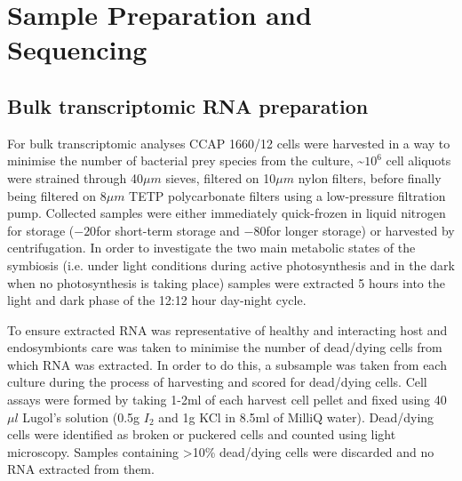 %
%


\section{Sample Preparation and Sequencing}

\subsection{Bulk transcriptomic RNA preparation}
For bulk transcriptomic analyses CCAP 1660/12 cells were harvested in a way to minimise the 
number of bacterial prey species from the culture, \textasciitilde \(10^{6}\) 
cell aliquots were strained through 40\(\mu m\) sieves, filtered on 
10\(\mu m\) nylon filters, 
before finally being filtered on 8\(\mu m\) TETP polycarbonate filters using a 
low-pressure filtration pump.  Collected samples were either immediately 
quick-frozen in liquid nitrogen for storage (\(-20\)\celsius for short-term storage 
and \(-80\)\celsius for longer storage) or harvested by centrifugation.  
In order to investigate the two main metabolic states of the symbiosis 
(i.e. under light conditions during active photosynthesis and in the dark 
when no photosynthesis is taking place) samples were extracted 5 hours into 
the light and dark phase of the 12:12 hour day-night cycle.

To ensure extracted RNA was representative of healthy and interacting host 
and endosymbionts care was taken to minimise the number of dead/dying cells 
from which RNA was extracted.  In order to do this, a subsample was taken 
from each culture during the process of harvesting and scored for dead/dying cells.  
Cell assays were formed by taking 1-2ml of each harvest cell pellet and 
fixed using 40\(\mu l\) Lugol's solution (0.5g \(I_{2}\) and 1g KCl in 8.5ml 
of MilliQ water). Dead/dying cells were identified as broken or puckered cells 
and counted using light microscopy.  Samples containing >10\% dead/dying cells 
were discarded and no RNA extracted from them.

